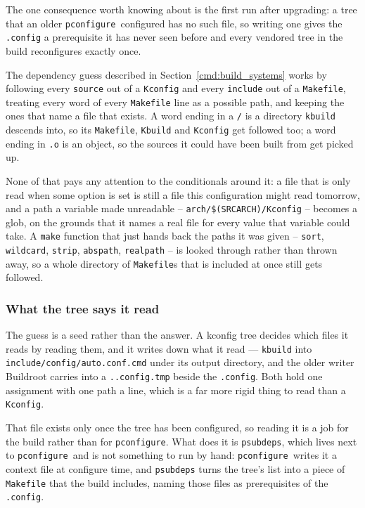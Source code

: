 \documentclass{article}
\newcommand{\pconfigure}{\texttt{pconfigure}}
\begin{document}
The one consequence worth knowing about is the first run after
upgrading: a tree that an older \pconfigure\ configured has no such
file, so writing one gives the \texttt{.config} a prerequisite it has
never seen before and every vendored tree in the build reconfigures
exactly once.

The dependency guess described in Section~\ref{cmd:build_systems}
works by following every \texttt{source} out of a \texttt{Kconfig} and
every \texttt{include} out of a \texttt{Makefile}, treating every word
of every \texttt{Makefile} line as a possible path, and keeping the
ones that name a file that exists.  A word ending in a \texttt{/} is a
directory \texttt{kbuild} descends into, so its \texttt{Makefile},
\texttt{Kbuild} and \texttt{Kconfig} get followed too; a word ending
in \texttt{.o} is an object, so the sources it could have been built
from get picked up.

None of that pays any attention to the conditionals around it: a file
that is only read when some option is set is still a file this
configuration might read tomorrow, and a path a variable made
unreadable -- \texttt{arch/\$(SRCARCH)/Kconfig} -- becomes a glob, on
the grounds that it names a real file for every value that variable
could take.  A \texttt{make} function that just hands back the paths
it was given -- \texttt{sort}, \texttt{wildcard}, \texttt{strip},
\texttt{abspath}, \texttt{realpath} -- is looked through rather than
thrown away, so a whole directory of \texttt{Makefile}s that is
included at once still gets followed.

\subsubsection{What the tree says it read}

The guess is a seed rather than the answer.  A kconfig tree decides
which files it reads by reading them, and it writes down what it read
--- \texttt{kbuild} into
\texttt{include/config/auto.conf.cmd} under its output directory, and
the older writer Buildroot carries into a \texttt{..config.tmp} beside
the \texttt{.config}.  Both hold one assignment with one path a line,
which is a far more rigid thing to read than a \texttt{Kconfig}.

That file exists only once the tree has been configured, so reading it
is a job for the build rather than for \pconfigure.  What does it is
\texttt{psubdeps}, which lives next to \pconfigure\ and is not
something to run by hand: \pconfigure\ writes it a context file at
configure time, and \texttt{psubdeps} turns the tree's list into a
piece of \texttt{Makefile} that the build includes, naming those
files as prerequisites of the \texttt{.config}.
\end{document}

